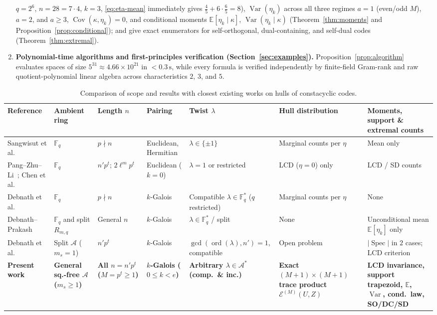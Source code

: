 \documentclass[preprint,12pt]{elsarticle}
\newcommand{\F}{\mathbb F}
\newcommand{\A}{\mathcal A}
\newcommand{\Epoly}{\mathscr E}
\newcommand{\ord}{\operatorname{ord}}
\newcommand{\Var}{\operatorname{Var}}
\newcommand{\Cov}{\operatorname{Cov}}
\numberwithin{equation}{section}
\theoremstyle{plain}
\theoremstyle{definition}
\theoremstyle{remark}
\begin{document}
\begin{enumerate}
$q=2^6$, $n=28=7\cdot 4$, $k=3$, \eqref{eq:eta-mean} immediately gives
$\frac{4}{5}+6\cdot\frac{6}{5}=8$), $\Var(\eta_k)$ across all three regimes $a=1$
(even/odd $M$), $a=2$, and $a\ge 3$, $\Cov(\kappa,\eta_k)=0$, and conditional
moments $\mathbb E[\eta_k\mid\kappa]$, $\Var(\eta_k\mid\kappa)$
(Theorem~\ref{thm:moments} and Proposition~\ref{prop:conditional}); and give
exact enumerators for self-orthogonal, dual-containing, and self-dual codes
(Theorem~\ref{thm:extremal}).
\item \textbf{Polynomial-time algorithms and first-principles verification
(Section~\ref{sec:examples}).} Proposition~\ref{prop:algorithm} evaluates spaces
of size $5^{31}\approx 4.66\times 10^{21}$ in $<0.3\,\mathrm{s}$, while every
formula is verified independently by finite-field Gram-rank and raw
quotient-polynomial linear algebra across characteristics $2$, $3$, and $5$.
\end{enumerate}

\begin{table}[htbp]
\centering
\caption{Comparison of scope and results with closest existing works on hulls of constacyclic codes.}
\label{tab:literature}
\scriptsize
\setlength{\tabcolsep}{3.5pt}
\begin{tabular}{@{}L{2.8cm}L{1.7cm}L{1.3cm}L{1.5cm}L{2.3cm}L{2.1cm}L{2.5cm}@{}}
\toprule
Reference & Ambient ring & Length $n$ & Pairing & Twist $\lambda$ & Hull distribution & Moments, support \& extremal counts \\
\midrule
Sangwisut et al.~\cite{sangwisut2015} & $\F_q$ & $p\nmid n$ & Euclidean, Hermitian & $\lambda\in\{\pm 1\}$ & Marginal counts per $\eta$ & Mean only \\
Pang--Zhu--Li~\cite{pangZhuLi2018}; Chen et al.~\cite{chenDinhLiu2015} & $\F_q$ & $n'p^t$; $2\ell^m p^t$ & Euclidean ($k=0$) & $\lambda=1$ or restricted & LCD ($\eta=0$) only & LCD / SD counts \\
Debnath et al.~\cite{debnathConstacyclic2023,debnathCorrection2023} & $\F_q$ & $p\nmid n$ & $k$-Galois & Compatible $\lambda\in\F_q^*$ ($q$ restricted) & Marginal counts per $\eta$ & None \\
Debnath--Prakash~\cite{debnathAverage2025} & $\F_q$ and split $R_{m,q}$ & General $n$ & $k$-Galois & $\lambda\in\F_q^*$ / split & None & Unconditional mean $\mathbb E[\eta_k]$ only \\
Debnath et al.~\cite{debnathAffine2026} & Split $\A$ ($m_s=1$) & $n'p^t$ & $k$-Galois & $\gcd(\ord(\lambda),n')=1$, compatible & Open problem \cite[p.~23]{debnathAffine2026} & $|\operatorname{Spec}|$ in $2$ cases; LCD criterion \\
\textbf{Present work} & \textbf{General sq.-free $\A$ ($m_s\ge 1$)} & \textbf{All $n=n'p^t$ ($M=p^t\ge 1$)} & \textbf{$k$-Galois ($0\le k<e$)} & \textbf{Arbitrary $\lambda\in\A^*$ (comp.\ \& inc.)} & \textbf{Exact $(M+1)\!\times\!(M+1)$ trace product $\Epoly^{(M)}(U,Z)$} & \textbf{LCD invariance, support trapezoid, $\mathbb E$, $\Var$, cond.\ law, SO/DC/SD} \\
\bottomrule
\end{tabular}
\end{table}
\end{document}
